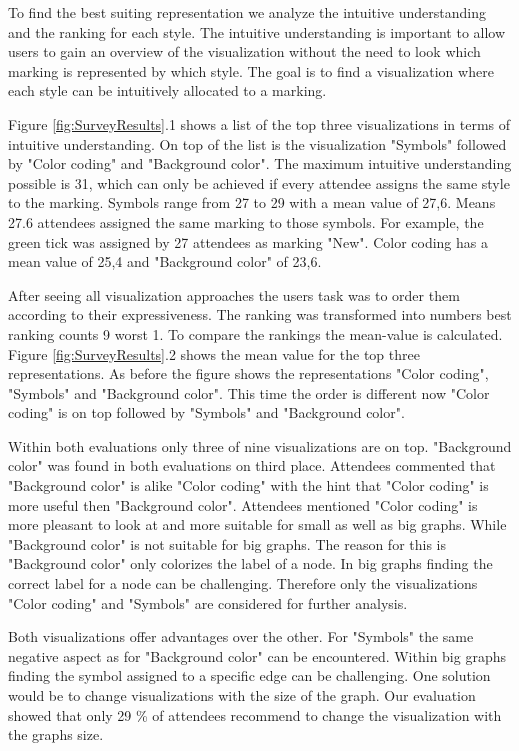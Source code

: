 \documentclass{llncs}
\begin{document}
To find the best suiting representation we analyze the intuitive understanding and the ranking for each style. The intuitive understanding is important to allow users to gain an overview of the visualization without the need to look which marking is represented by which style. The goal is to find a visualization where each style can be intuitively allocated to a marking.

Figure \ref{fig:SurveyResults}.1 shows a list of the top three visualizations in terms of intuitive understanding. On top of the list is the visualization "Symbols" followed by "Color coding" and "Background color". The maximum intuitive understanding possible is 31, which can only be achieved if every attendee assigns the same style to the marking. Symbols range from 27 to 29 with a mean value of 27,6. Means 27.6 attendees assigned the same marking to those symbols. For example, the green tick was assigned by 27 attendees as marking "New". Color coding has a mean value of 25,4 and "Background color" of 23,6.

After seeing all visualization approaches the users task was to order them according to their expressiveness. The ranking was transformed into numbers best ranking counts 9 worst 1. To compare the rankings the mean-value is calculated. Figure \ref{fig:SurveyResults}.2 shows the mean value for the top three representations. As before the figure shows the representations "Color coding", "Symbols" and "Background color". This time the order is different now "Color coding" is on top followed by "Symbols" and "Background color".

Within both evaluations only three of nine visualizations are on top. "Background color" was found in both evaluations on third place. Attendees commented that "Background color" is alike "Color coding" with the hint that "Color coding" is more useful then "Background color". Attendees mentioned "Color coding" is more pleasant to look at and more suitable for small as well as big graphs. While "Background color" is not suitable for big graphs. The reason for this is "Background color" only colorizes the label of a node. In big graphs finding the correct label for a node can be challenging. Therefore only the visualizations "Color coding" and "Symbols" are considered for further analysis.

Both visualizations offer advantages over the other. For "Symbols" the same negative aspect as for "Background color" can be encountered. Within big graphs finding the symbol assigned to a specific edge can be challenging. One solution would be to change visualizations with the size of the graph. Our evaluation showed that only 29 \% of attendees recommend to change the visualization with the graphs size.
\end{document}
